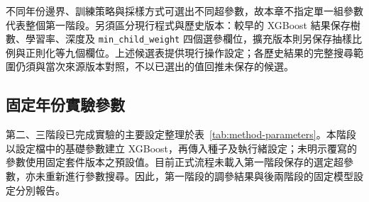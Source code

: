 不同年份邊界、訓練策略與採樣方式可選出不同超參數，故本章不指定單一組參數代表整個第一階段。另須區分現行程式與歷史版本：較早的 XGBoost 結果保存樹數、學習率、深度及 \nolinkurl{min_child_weight} 四個選參欄位，擴充版本則另保存抽樣比例與正則化等九個欄位。上述候選表提供現行操作設定；各歷史結果的完整搜尋範圍仍須與當次來源版本對照，不以已選出的值回推未保存的候選。

\clearpage
\subsection{固定年份實驗參數}

第二、三階段已完成實驗的主要設定整理於表~\ref{tab:method-parameters}。本階段以設定檔中的基礎參數建立 XGBoost，再傳入種子及執行緒設定；未明示覆寫的參數使用固定套件版本之預設值。目前正式流程未載入第一階段保存的選定超參數，亦未重新進行參數搜尋。因此，第一階段的調參結果與後兩階段的固定模型設定分別報告。

